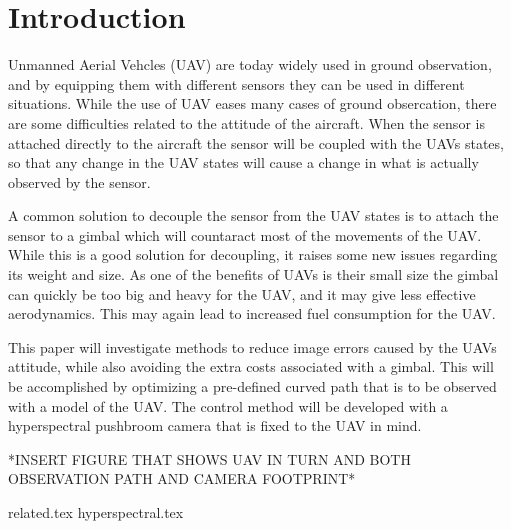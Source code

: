 \chapter{Introduction}

Unmanned Aerial Vehcles (UAV) are today widely used in ground observation, and by equipping them with different sensors they can be used in different situations. While the use of UAV eases many cases of ground obsercation, there are some difficulties related to the attitude of the aircraft. When the sensor is attached directly to the aircraft the sensor will be coupled with the UAVs states, so that any change in the UAV states will cause a change in what is actually observed by the sensor.

A common solution to decouple the sensor from the UAV states is to attach the sensor to a gimbal which will countaract most of the movements of the UAV. While this is a good solution for decoupling, it raises some new issues regarding its weight and size. As one of the benefits of UAVs is their small size the gimbal can quickly be too big and heavy for the UAV, and it may give less effective aerodynamics. This may again lead to increased fuel consumption for the UAV.

This paper will investigate methods to reduce image errors caused by the UAVs attitude, while also avoiding the extra costs associated with a gimbal. This will be accomplished by optimizing a pre-defined curved path that is to be observed with a model of the UAV. The control method will be developed with a hyperspectral pushbroom camera that is fixed to the UAV in mind.

*INSERT FIGURE THAT SHOWS UAV IN TURN AND BOTH OBSERVATION PATH AND CAMERA FOOTPRINT*

{related.tex}
{hyperspectral.tex}